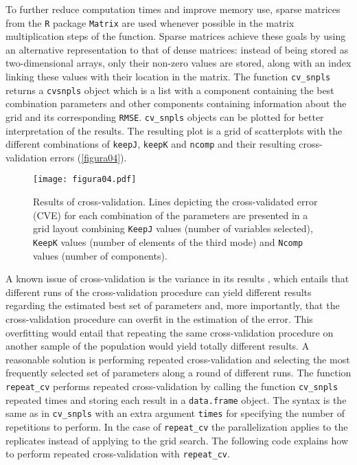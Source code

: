 To further reduce computation times and improve memory use, sparse matrices from the \texttt{R} package \texttt{Matrix} \parencite{matrixsparse} are used whenever possible in the matrix multiplication steps of the function. Sparse matrices achieve these goals by using an alternative representation to that of dense matrices: instead of being stored as two-dimensional arrays, only their non-zero values are stored, along with an index linking these values with their location in the matrix. The function \texttt{cv\_snpls} returns a \texttt{cvsnpls} object which is a list with a component containing the best combination parameters and other components containing information about the grid and its corresponding \texttt{RMSE}. \texttt{cv\_snpls} objects  can be plotted for better interpretation of the results. The resulting plot is a grid of scatterplots with the different combinations of \texttt{keepJ}, \texttt{keepK} and \texttt{ncomp} and their resulting cross-validation errors (\autoref{figura04}).

\vspace{10pt}
\begin{figure}[!ht]
	\centering
\texttt{[image: figura04.pdf]}
\caption[Results of cross-validation]{Results of cross-validation. Lines depicting the cross-validated error (CVE) for each combination of the parameters are presented in a grid layout combining \texttt{KeepJ} values (number of variables selected), \texttt{KeepK} values (number of elements of the third mode) and \texttt{Ncomp} values (number of components).}
\label{figura04}
\end{figure}
\vspace{10pt}

A known issue of cross-validation is the variance in its results \parencite{krstajic2014cross}, which entails that different runs of the cross-validation procedure can yield different results regarding the estimated best set of parameters and, more importantly, that the cross-validation procedure can overfit in the estimation of the error. This overfitting would entail that repeating the same cross-validation procedure on another sample of the population would yield totally different results. A reasonable solution is performing repeated cross-validation and selecting the most frequently selected set of parameters along a round of different runs. The function \texttt{repeat\_cv} performs repeated cross-validation by calling the function \texttt{cv\_snpls} repeated times and storing each result in a \texttt{data.frame} object. The syntax is the same as in \texttt{cv\_snpls} with an extra argument \texttt{times} for specifying the number of repetitions to perform. In the case of \texttt{repeat\_cv} the parallelization applies to the replicates instead of applying to the grid search. The following code explains how to perform repeated cross-validation with \texttt{repeat\_cv}.

